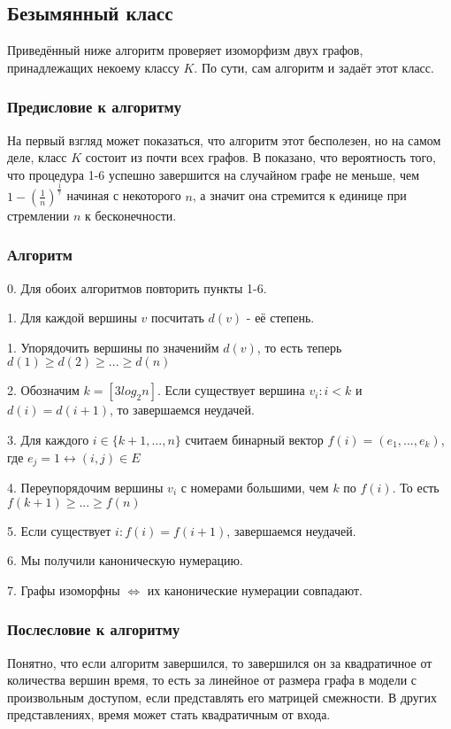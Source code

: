 \subsection{Безымянный класс}

Приведённый ниже алгоритм проверяет изоморфизм двух графов, принадлежащих некоему классу $K$. По сути, сам алгоритм и задаёт этот класс. 

\subsubsection*{Предисловие к алгоритму}
На первый взгляд может показаться, что алгоритм этот бесполезен, но на самом деле, класс $K$ состоит из почти всех графов. В \cite{14} показано, что вероятность того, что процедура 1-6 успешно завершится на случайном графе не меньше, чем $1-(\frac{1}{n})^{\frac{1}{7}}$ начиная с некоторого $n$, а значит она стремится к единице при стремлении $n$ к бесконечности.

\subsubsection*{Алгоритм}

0. Для обоих алгоритмов повторить пункты 1-6.

1. Для каждой вершины $v$ посчитать $d(v)$ - её степень.

1. Упорядочить вершины по значенийм $d(v)$, то есть теперь $d(1) \geqslant d(2) \geqslant ... \geqslant d(n)$

2. Обозначим $k = [3log_2n]$. Если существует вершина $v_i: i < k$ и $d(i) = d(i + 1)$, то завершаемся неудачей.

3. Для каждого $i \in \{k+1, ..., n\}$ считаем бинарный вектор $f(i) = (e_1, ..., e_k)$, где $e_j = 1 \leftrightarrow (i, j) \in E$

4. Переупорядочим вершины $v_i$ с номерами большими, чем $k$ по $f(i)$. То есть $f(k + 1) \geqslant ... \geqslant f(n)$

5. Если существует $i: f(i) = f(i + 1)$, завершаемся неудачей.

6. Мы получили каноническую нумерацию.

7. Графы изоморфны $\Leftrightarrow$ их канонические нумерации совпадают.

\subsubsection*{Послесловие к алгоритму}

Понятно, что если алгоритм завершился, то завершился он за квадратичное от количества вершин время, то есть за линейное от размера графа в модели с произвольным доступом, если представлять его матрицей смежности. В других представлениях, время может стать квадратичным от входа. 
